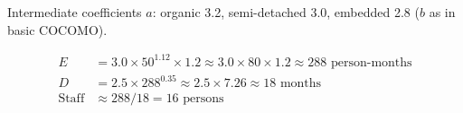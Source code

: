 \noindent Intermediate coefficients $a$: organic 3.2, semi-detached 3.0, embedded 2.8 ($b$ as in basic COCOMO).
\begin{formulas}
\begin{align*}
E &= 3.0 \times 50^{1.12} \times 1.2 \approx 3.0 \times 80 \times 1.2 \approx 288 \text{ person-months}\\
D &= 2.5 \times 288^{0.35} \approx 2.5 \times 7.26 \approx 18 \text{ months}\\
\text{Staff} &\approx 288 / 18 = 16 \text{ persons}
\end{align*}
\end{formulas}
